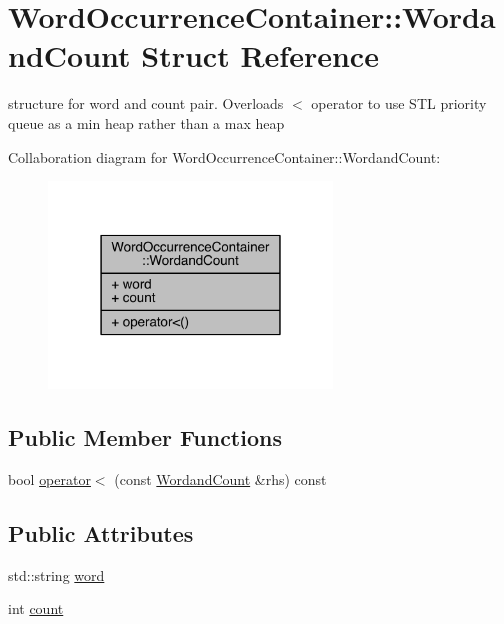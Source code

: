 \hypertarget{struct_word_occurrence_container_1_1_wordand_count}{}\section{Word\+Occurrence\+Container\+:\+:Wordand\+Count Struct Reference}
\label{struct_word_occurrence_container_1_1_wordand_count}


structure for word and count pair. Overloads $<$ operator to use S\+TL priority queue as a min heap rather than a max heap  




Collaboration diagram for Word\+Occurrence\+Container\+:\+:Wordand\+Count\+:\nopagebreak
\begin{figure}[H]
\begin{center}
\leavevmode
\includegraphics[width=214pt]{struct_word_occurrence_container_1_1_wordand_count__coll__graph}
\end{center}
\end{figure}
\subsection*{Public Member Functions}
\begin{DoxyCompactItemize}
\item 
bool \mbox{\hyperlink{struct_word_occurrence_container_1_1_wordand_count_a6922cc342d2df02f2786a5f1e676c7c0}{operator$<$}} (const \mbox{\hyperlink{struct_word_occurrence_container_1_1_wordand_count}{Wordand\+Count}} \&rhs) const
\end{DoxyCompactItemize}
\subsection*{Public Attributes}
\begin{DoxyCompactItemize}
\item 
std\+::string \mbox{\hyperlink{struct_word_occurrence_container_1_1_wordand_count_a7350d13d7a0942fb29f92826e6133252}{word}}
\item 
int \mbox{\hyperlink{struct_word_occurrence_container_1_1_wordand_count_afdf294dfe0ee38b2d79d2def3c46b11a}{count}}
\end{DoxyCompactItemize}


